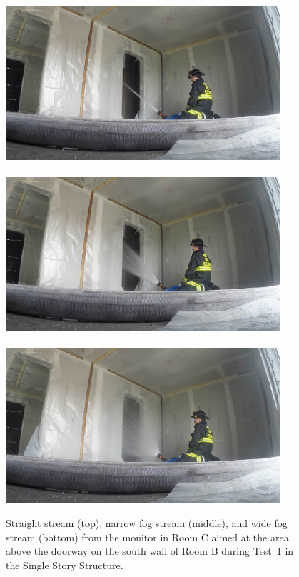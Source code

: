 \documentclass[12pt,oneside]{book}
\begin{document}
\begin{figure}[!ht]
	\includegraphics[trim=16cm 6.25cm 9cm 6cm, clip=true, width=4in]{../Figures/Pictures/SS_Room_B_Test_33}
	\\~\\
	\includegraphics[trim=16cm 6.25cm 9cm 6cm, clip=true, width=4in]{../Figures/Pictures/NF_Room_B_Test_33}
	\\~\\
	\includegraphics[trim=16cm 6.25cm 9cm 6cm, clip=true, width=4in]{../Figures/Pictures/WF_Room_B_Test_33}
	\caption[Straight stream, narrow fog stream, and wide fog stream during Test~1.]{Straight stream (top), narrow fog stream (middle), and wide fog stream (bottom) from the monitor in Room C aimed at the area above the doorway on the south wall of Room B during Test~1 in the Single Story Structure.}
	\label{fig:test_1_pic}
\end{figure}
\end{document}
